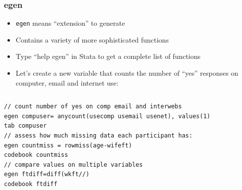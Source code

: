 \documentclass[table]{beamer}
\begin{document}
\begin{frame}[fragile]
\frametitle{egen}
\label{sec-2-6}

\begin{itemize}
\item \verb~egen~ means ``extension'' to generate
\item Contains a variety of more sophisticated functions
\item Type ``help egen'' in Stata to get a complete list of functions
\item Let's create a new variable that counts the number of ``yes'' responses on computer, email and internet use:
\end{itemize}
\vspace{-.5em} \begin{columns}  \begin{block}{}

\begin{verbatim}
// count number of yes on comp email and interwebs 
egen compuser= anycount(usecomp usemail usenet), values(1)
tab compuser
// assess how much missing data each participant has:
egen countmiss = rowmiss(age-wifeft)
codebook countmiss
// compare values on multiple variables
egen ftdiff=diff(wkft//)
codebook ftdiff
\end{verbatim}
\end{block} \end{columns}
\end{frame}
\end{document}
